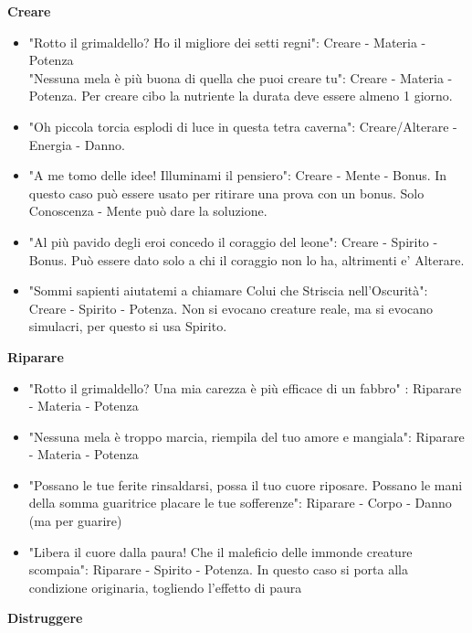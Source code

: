 \documentclass[a4paper,twoside,openany]{book}
\begin{document}
\begin{multicols}{2}
\textbf{Creare}

\begin{itemize}[leftmargin=*] \setlength{\itemsep}{0pt}	
\item "Rotto il grimaldello? Ho il migliore dei setti regni": Creare - Materia - Potenza\\
"Nessuna mela è più buona di quella che puoi creare tu": Creare - Materia - Potenza. Per creare cibo la nutriente la durata deve essere almeno 1 giorno.
\item "Oh piccola torcia esplodi di luce in questa tetra caverna": Creare/Alterare - Energia - Danno.
\item "A me tomo delle idee! Illuminami il pensiero": Creare - Mente - Bonus. In questo caso può essere usato per ritirare una prova con un bonus. Solo Conoscenza - Mente può dare la soluzione.
\item "Al più pavido degli eroi concedo il coraggio del leone": Creare - Spirito - Bonus. Può essere dato solo a chi il coraggio non lo ha, altrimenti e' Alterare.
\item "Sommi sapienti aiutatemi a chiamare Colui che Striscia nell'Oscurità": Creare - Spirito - Potenza. Non si evocano creature reale, ma si evocano simulacri, per questo si usa Spirito.
\end{itemize}


\textbf{Riparare}
\begin{itemize}[leftmargin=*] \setlength{\itemsep}{0pt}	
\item "Rotto il grimaldello? Una mia carezza è più efficace di un fabbro" : Riparare - Materia - Potenza
\item "Nessuna mela è troppo marcia, riempila del tuo amore e mangiala": Riparare - Materia - Potenza
\item "Possano le tue ferite rinsaldarsi, possa il tuo cuore riposare. Possano le mani della somma guaritrice placare le tue sofferenze": Riparare - Corpo - Danno (ma per guarire)
\item "Libera il cuore dalla paura! Che il maleficio delle immonde creature scompaia": Riparare - Spirito - Potenza. In questo caso si porta alla condizione originaria, togliendo l'effetto di paura
\end{itemize}

\textbf{Distruggere}


\end{multicols}
\end{document}
